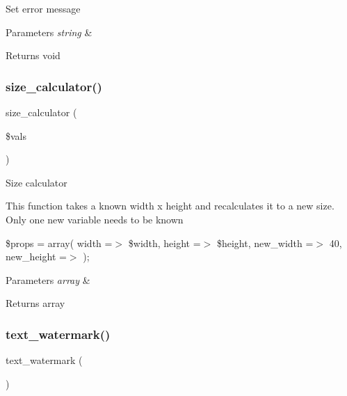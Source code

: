 Set error message


\begin{DoxyParams}{Parameters}
{\em string} & \\
\hline
\end{DoxyParams}
\begin{DoxyReturn}{Returns}
void 
\end{DoxyReturn}
\mbox{\label{class_c_i___image__lib_a827549db4de2281a8f2b35ada2ef3909}} 
\subsubsection{\texorpdfstring{size\+\_\+calculator()}{size\_calculator()}}
{\footnotesize\ttfamily size\+\_\+calculator (\begin{DoxyParamCaption}\item[{}]{\$vals }\end{DoxyParamCaption})}

Size calculator

This function takes a known width x height and recalculates it to a new size. Only one new variable needs to be known

\$props = array( \textquotesingle{}width\textquotesingle{} =$>$ \$width, \textquotesingle{}height\textquotesingle{} =$>$ \$height, \textquotesingle{}new\+\_\+width\textquotesingle{} =$>$ 40, \textquotesingle{}new\+\_\+height\textquotesingle{} =$>$ \textquotesingle{}\textquotesingle{} );


\begin{DoxyParams}{Parameters}
{\em array} & \\
\hline
\end{DoxyParams}
\begin{DoxyReturn}{Returns}
array 
\end{DoxyReturn}
\mbox{\label{class_c_i___image__lib_afb7640b6150e16b00efac0511d9fa03d}} 
\subsubsection{\texorpdfstring{text\+\_\+watermark()}{text\_watermark()}}
{\footnotesize\ttfamily text\+\_\+watermark (\begin{DoxyParamCaption}{ }\end{DoxyParamCaption})}

